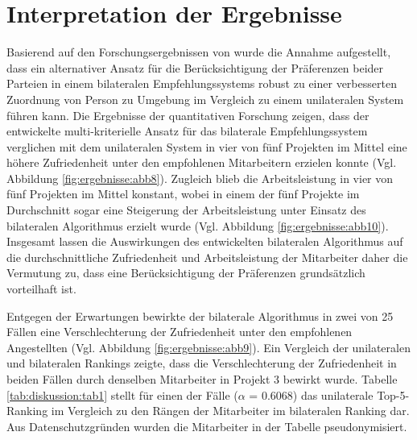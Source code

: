 \section{Interpretation der Ergebnisse}
Basierend auf den Forschungsergebnissen von \textcite[S.1 ff.]{link:booklet} wurde die Annahme aufgestellt, dass ein alternativer Ansatz für die Berücksichtigung der Präferenzen beider Parteien in einem bilateralen Empfehlungssystems robust zu einer verbesserten Zuordnung von Person zu Umgebung im Vergleich zu einem unilateralen System führen kann.
Die Ergebnisse der quantitativen Forschung zeigen, dass der entwickelte multi-kriterielle Ansatz für das bilaterale Empfehlungssystem verglichen mit dem unilateralen System in vier von fünf Projekten im Mittel eine höhere Zufriedenheit unter den empfohlenen Mitarbeitern erzielen konnte (Vgl. Abbildung \ref{fig:ergebnisse:abb8}).
Zugleich blieb die Arbeitsleistung in vier von fünf Projekten im Mittel konstant, wobei in einem der fünf Projekte im Durchschnitt sogar eine Steigerung der Arbeitsleistung unter Einsatz des bilateralen Algorithmus erzielt wurde (Vgl. Abbildung \ref{fig:ergebnisse:abb10}).
Insgesamt lassen die Auswirkungen des entwickelten bilateralen Algorithmus auf die durchschnittliche Zufriedenheit und Arbeitsleistung der Mitarbeiter daher die Vermutung zu, dass eine Berücksichtigung der Präferenzen grundsätzlich vorteilhaft ist.

Entgegen der Erwartungen bewirkte der bilaterale Algorithmus in zwei von 25 Fällen eine Verschlechterung der Zufriedenheit unter den empfohlenen Angestellten (Vgl. Abbildung \ref{fig:ergebnisse:abb9}).
Ein Vergleich der unilateralen und bilateralen Rankings zeigte, dass die Verschlechterung der Zufriedenheit in beiden Fällen durch denselben Mitarbeiter in Projekt 3 bewirkt wurde.
Tabelle \ref{tab:diskussion:tab1} stellt für einen der Fälle ($\alpha$ = 0.6068) das unilaterale Top-5-Ranking im Vergleich zu den Rängen der Mitarbeiter im bilateralen Ranking dar.
Aus Datenschutzgründen wurden die Mitarbeiter in der Tabelle pseudonymisiert.

